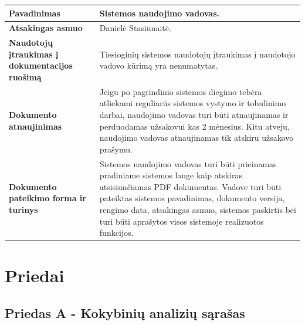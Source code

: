 \documentclass[12pt]{article}
\begin{document}
\begin{table}[htb!]
    \captionsetup{justification=centering}
    \begin{tabular}{|m{6cm}|m{10cm}|}
        \hline
        \raggedleft \textbf{\cellcolor{deepchampagne}Pavadinimas} &
        Sistemos naudojimo vadovas. \\
        \hline
        \raggedleft \textbf{\cellcolor{deepchampagne}Atsakingas asmuo} &
        Danielė Stasiūnaitė. \\
        \hline
        \raggedleft \textbf{\cellcolor{deepchampagne}Naudotojų įtraukimas į
        dokumentacijos ruošimą} & 
        Tiesioginių sistemos naudotojų įtraukimas į naudotojo vadovo kūrimą yra
        nenumatytas. \\
        \hline
        \raggedleft \textbf{\cellcolor{deepchampagne}Dokumento atnaujinimas} &
        Jeigu po pagrindinio sistemos diegimo tebėra atliekami reguliarūs
        sistemos vystymo ir tobulinimo darbai, naudojimo vadovas turi būti
        atnaujinamas ir perduodamas užsakovui kas 2 mėnesius. Kitu atveju,
        naudojimo vadovas atnaujinamas tik atskiru užsakovo prašymu. \\
        \hline
        \raggedleft \textbf{\cellcolor{deepchampagne}Dokumento pateikimo forma
        ir turinys} &
        Sistemos naudojimo vadovas turi būti prieinamas pradiniame sistemos
        lange kaip atskiras atsisiunčiamas PDF dokumentas. Vadove turi būti
        pateiktas sistemos pavadinimas, dokumento versija, rengimo data,
        atsakingas asmuo, sistemos paskirtis bei turi būti aprašytos visos
        sistemoje realizuotos funkcijos. \\
        \hline
    \end{tabular}
\end{table}

\newpage

\section{Priedai}
\subsection{Priedas A - Kokybinių analizių sąrašas}
\end{document}
